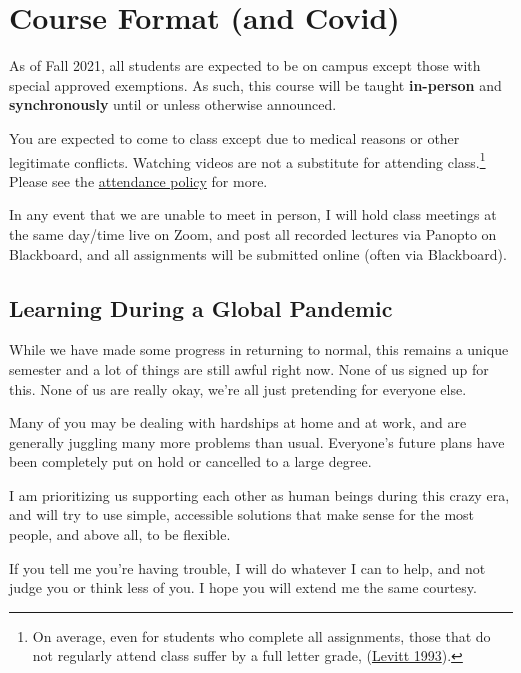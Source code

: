 \documentclass{article}
\begin{document}
\hypertarget{course-format-and-covid}{%
\section{Course Format (and Covid)}\label{course-format-and-covid}}

As of Fall 2021, all students are expected to be on campus except those
with special approved exemptions. As such, this course will be taught
\textbf{in-person} and \textbf{synchronously} until or unless otherwise
announced.

You are expected to come to class except due to medical reasons or other
legitimate conflicts. Watching videos are not a substitute for attending
class.\footnote{On average, even for students who complete all
  assignments, those that do not regularly attend class suffer by a full
  letter grade,
  (\href{https://www.aeaweb.org/articles?id=10.1257/jep.7.3.167}{Levitt
  1993}).} Please see the \protect\hyperlink{attendance}{attendance
policy} for more.

In any event that we are unable to meet in person, I will hold class
meetings at the same day/time live on Zoom, and post all recorded
lectures via Panopto on Blackboard, and all assignments will be
submitted online (often via Blackboard).

\hypertarget{learning-during-a-global-pandemic}{%
\subsection{Learning During a Global
Pandemic}\label{learning-during-a-global-pandemic}}

While we have made some progress in returning to normal, this remains a
unique semester and a lot of things are still awful right now. None of
us signed up for this. None of us are really okay, we're all just
pretending for everyone else.

Many of you may be dealing with hardships at home and at work, and are
generally juggling many more problems than usual. Everyone's future
plans have been completely put on hold or cancelled to a large degree.

I am prioritizing us supporting each other as human beings during this
crazy era, and will try to use simple, accessible solutions that make
sense for the most people, and above all, to be flexible.

If you tell me you're having trouble, I will do whatever I can to help,
and not judge you or think less of you. I hope you will extend me the
same courtesy.
\end{document}
